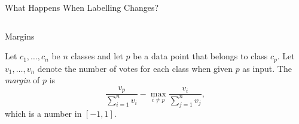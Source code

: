 \documentclass{beamer}
\begin{document}
\begin{frame}{What Happens When Labelling Changes?}
\begin{columns}
\begin{column}{0.5\textwidth}
    \end{column}
  \end{columns}
\end{frame}

\begin{frame}{Margins}
  \begin{definition}
    Let $c_1, \dots, c_n$ be $n$ \alert{classes} and let $p$ be a \alert{data point} that belongs
    to class $c_p$. Let $v_1, \dots, v_n$ denote the \alert{number of votes} for each
    class when given $p$ as input. The \alert{\emph{margin}} of $p$ is
    \[ \frac{v_p}{\sum_{i=1}^n v_i} - \max_{i \ne p} \frac{v_i}{\sum_{j=1}^n v_j}, \]
    which is a number in $[-1, 1]$.
  \end{definition}
\end{frame}
\end{document}
